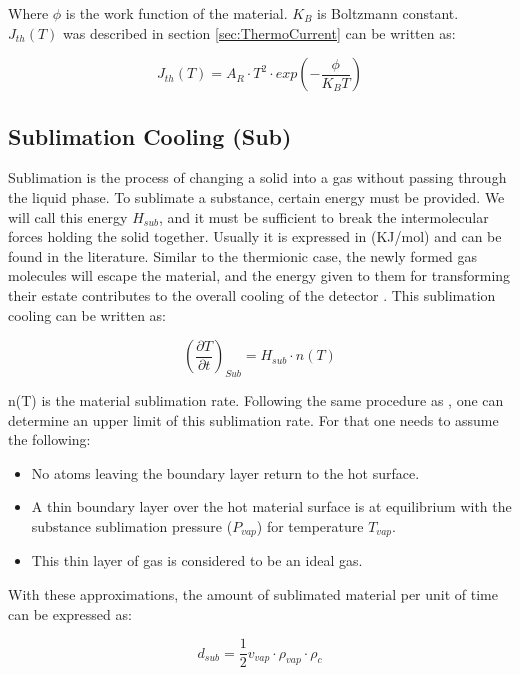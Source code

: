 Where $\phi$ is the work function of the material. $K_B$ is Boltzmann constant. $J_{th} (T)$ was described in section \ref{sec:ThermoCurrent} can be written as: 

\begin{equation}
    J_{th} (T) = A_R \cdot T^2\cdot exp\left(-\frac{\phi}{K_B T}\right)
\end{equation}

\subsection{Sublimation Cooling (Sub)}

Sublimation is the process of changing a solid into a gas without passing through the liquid phase. To sublimate a substance, certain energy must be provided. We will call this energy $H_{sub}$, and it must be sufficient to break the intermolecular forces holding the solid together. Usually it is expressed in (KJ/mol) and can be found in the literature. Similar to the thermionic case, the newly formed gas molecules will escape the material, and the energy given to them for transforming their estate contributes to the overall cooling of the detector \parencite[][]{ref:SublimationCooling}. This sublimation cooling can be written as: 

\begin{equation}
    \left(\frac{\partial T}{\partial t}\right)_{Sub} = H_{sub}\cdot n(T)
\end{equation}

n(T) is the material sublimation rate. Following the same procedure as \parencite[][]{ref:SubRate}, one can determine an upper limit of this sublimation rate. For that one needs to assume the following: 

\begin{itemize}
    \item No atoms leaving the boundary layer return to the hot surface. 
    \item A thin boundary layer over the hot material surface is at equilibrium with the substance sublimation pressure ($P_{vap}$) for temperature $T_{vap}$. 
    \item This thin layer of gas is considered to be an ideal gas. 
\end{itemize}

With these approximations, the amount of sublimated material per unit of time can be expressed as: 

\begin{equation}
    d_{sub} = \frac{1}{2}v_{vap}\cdot \rho_{vap} \cdot \rho_{c}
    \label{eq:SubMaterial}
\end{equation}

